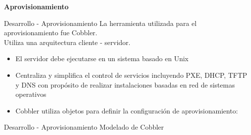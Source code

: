 
\begin{frame}
    \Huge
    \centering
    \textbf{Aprovisionamiento}

\end{frame}

\begin{frame}{Desarrollo - Aprovisionamiento}
    \vspace{-1.5cm}
    La herramienta utilizada para el aprovisionamiento fue Cobbler.
    \\
    Utiliza una arquitectura cliente - servidor.
    \begin{itemize}
        \item El servidor debe ejecutarse en un sistema basado en Unix
        \item Centraliza y simplifica el control de servicios incluyendo PXE, DHCP, TFTP y DNS con propósito de realizar instalaciones basadas en red de sistemas operativos
        \item Cobbler utiliza objetos para definir la configuración de aprovisionamiento:
    \end{itemize}
    
\end{frame}

\begin{frame}{Desarrollo - Aprovisionamiento}
    \vspace{0cm} {Modelado de Cobbler}
    \vspace{0.5cm}
    \begin{figure}[ht]
       \centering
       \vspace{-0.50cm}
    \end{figure}
\end{frame}

